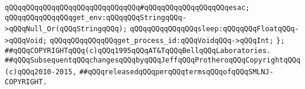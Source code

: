 \verb|qQQqqQQqqQQqqQQqqQQqqQQqqQQqqQQq#qQQqqQQqqQQqqQQqqQQqesac;|\newline
\newline
\verb|qQQqqQQqqQQqqQQqget_env:qQQqqQQqStringqQQq->qQQqNull_Or(qQQqStringqQQq);|\newline
\newline
\verb|qQQqqQQqqQQqqQQqsleep:qQQqqQQqFloatqQQq->qQQqVoid;|\newline
\newline
\verb|qQQqqQQqqQQqqQQqget_process_id:qQQqVoidqQQq->qQQqInt;|\newline
\newline
\verb|};|\newline
\newline
\newline
\verb|##qQQqCOPYRIGHTqQQq(c)qQQq1995qQQqAT&TqQQqBellqQQqLaboratories.|\newline
\verb|##qQQqSubsequentqQQqchangesqQQqbyqQQqJeffqQQqProtheroqQQqCopyrightqQQq(c)qQQq2010-2015,|\newline
\verb|##qQQqreleasedqQQqperqQQqtermsqQQqofqQQqSMLNJ-COPYRIGHT.|\newline

